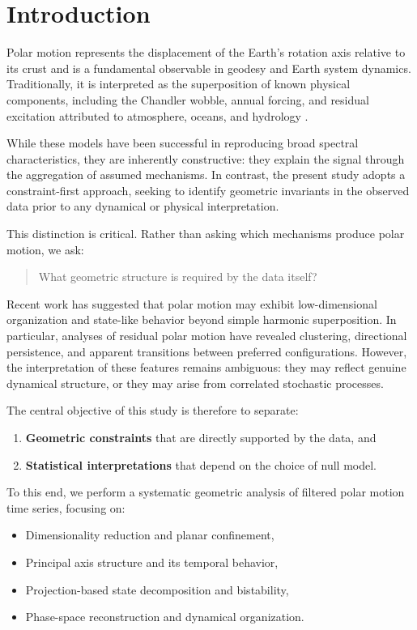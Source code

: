 \documentclass[twocolumn,9pt]{revtex4-2}
\begin{document}
\section{Introduction}
\label{sec:introduction}

Polar motion represents the displacement of the Earth's rotation axis relative to its crust and is a fundamental observable in geodesy and Earth system dynamics. Traditionally, it is interpreted as the superposition of known physical components, including the Chandler wobble, annual forcing, and residual excitation attributed to atmosphere, oceans, and hydrology \citep{dickman2000,gross2007}.

While these models have been successful in reproducing broad spectral characteristics, they are inherently constructive: they explain the signal through the aggregation of assumed mechanisms. In contrast, the present study adopts a constraint-first approach, seeking to identify geometric invariants in the observed data prior to any dynamical or physical interpretation.

This distinction is critical. Rather than asking which mechanisms produce polar motion, we ask:

\begin{quote}
What geometric structure is required by the data itself?
\end{quote}

Recent work has suggested that polar motion may exhibit low-dimensional organization and state-like behavior beyond simple harmonic superposition. In particular, analyses of residual polar motion have revealed clustering, directional persistence, and apparent transitions between preferred configurations. However, the interpretation of these features remains ambiguous: they may reflect genuine dynamical structure, or they may arise from correlated stochastic processes.

The central objective of this study is therefore to separate:
\begin{enumerate}
    \item \textbf{Geometric constraints} that are directly supported by the data, and
    \item \textbf{Statistical interpretations} that depend on the choice of null model.
\end{enumerate}

To this end, we perform a systematic geometric analysis of filtered polar motion time series, focusing on:

\begin{itemize}
    \item Dimensionality reduction and planar confinement,
    \item Principal axis structure and its temporal behavior,
    \item Projection-based state decomposition and bistability,
    \item Phase-space reconstruction and dynamical organization.
\end{itemize}
\end{document}

